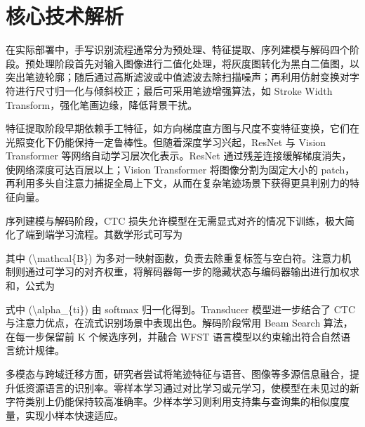\chapter{核心技术解析}
在实际部署中，手写识别流程通常分为预处理、特征提取、序列建模与解码四个阶段。预处理阶段首先对输入图像进行二值化处理，将灰度图转化为黑白二值图，以突出笔迹轮廓；随后通过高斯滤波或中值滤波去除扫描噪声；再利用仿射变换对字符进行尺寸归一化与倾斜校正；最后可采用笔迹增强算法，如 Stroke Width Transform，强化笔画边缘，降低背景干扰。\par
特征提取阶段早期依赖手工特征，如方向梯度直方图与尺度不变特征变换，它们在光照变化下仍能保持一定鲁棒性。但随着深度学习兴起，ResNet 与 Vision Transformer 等网络自动学习层次化表示。ResNet 通过残差连接缓解梯度消失，使网络深度可达百层以上；Vision Transformer 将图像分割为固定大小的 patch，再利用多头自注意力捕捉全局上下文，从而在复杂笔迹场景下获得更具判别力的特征向量。\par
序列建模与解码阶段，CTC 损失允许模型在无需显式对齐的情况下训练，极大简化了端到端学习流程。其数学形式可写为\par
[
\textbackslash{}mathcal\{{}L\}{}\underline{\{{}\textbackslash{}text\{{}CTC\}{}\}{} = -\textbackslash{}ln \textbackslash{}sum}\{{}\textbackslash{}pi \textbackslash{}in \textbackslash{}mathcal\{{}B\}{}\^{}\{{}-1\}{}(y)\}{} p(\textbackslash{}pi \textbackslash{}mid x)
]\par
其中 (\textbackslash{}mathcal\{{}B\}{}) 为多对一映射函数，负责去除重复标签与空白符。注意力机制则通过可学习的对齐权重，将解码器每一步的隐藏状态与编码器输出进行加权求和，公式为\par
[
c\_{}t = \textbackslash{}sum\_{}\{{}i=1\}{}\^{}\{{}T\}{} \textbackslash{}alpha\_{}\{{}ti\}{} h\_{}i
]\par
式中 (\textbackslash{}alpha\_{}\{{}ti\}{}) 由 softmax 归一化得到。Transducer 模型进一步结合了 CTC 与注意力优点，在流式识别场景中表现出色。解码阶段常用 Beam Search 算法，在每一步保留前 K 个候选序列，并融合 WFST 语言模型以约束输出符合自然语言统计规律。\par
多模态与跨域迁移方面，研究者尝试将笔迹特征与语音、图像等多源信息融合，提升低资源语言的识别率。零样本学习通过对比学习或元学习，使模型在未见过的新字符类别上仍能保持较高准确率。少样本学习则利用支持集与查询集的相似度度量，实现小样本快速适应。\par
